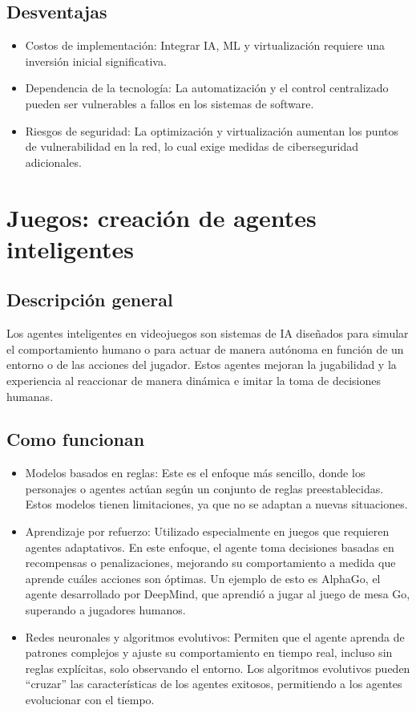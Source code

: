 \documentclass[12pt]{article}
\begin{document}
\subsection{Desventajas}
\begin{itemize}
    \item Costos de implementación: 
    Integrar IA, ML y virtualización requiere una inversión inicial significativa.
    \item Dependencia de la tecnología: 
    La automatización y el control centralizado pueden ser vulnerables a fallos en los sistemas de software.
    \item Riesgos de seguridad: 
    La optimización y virtualización aumentan los puntos de vulnerabilidad en la red, lo cual exige medidas de ciberseguridad adicionales.
\end{itemize}

\section{Juegos: creación de agentes inteligentes}
\subsection{Descripción general}
Los agentes inteligentes en videojuegos son sistemas de IA diseñados para simular el comportamiento humano o para actuar de manera
autónoma en función de un entorno o de las acciones del jugador. Estos agentes mejoran la jugabilidad y la experiencia al reaccionar 
de manera dinámica e imitar la toma de decisiones humanas.
\subsection{Como funcionan}
\begin{itemize}
    \item Modelos basados en reglas:
    Este es el enfoque más sencillo, donde los personajes o agentes actúan según un conjunto de reglas preestablecidas. 
    Estos modelos tienen limitaciones, ya que no se adaptan a nuevas situaciones.
    \item Aprendizaje por refuerzo: 
    Utilizado especialmente en juegos que requieren agentes adaptativos. 
    En este enfoque, el agente toma decisiones basadas en recompensas o penalizaciones, mejorando su comportamiento a 
    medida que aprende cuáles acciones son óptimas. Un ejemplo de esto es AlphaGo, el agente desarrollado por DeepMind, 
    que aprendió a jugar al juego de mesa Go, superando a jugadores humanos.
    \item Redes neuronales y algoritmos evolutivos: 
    Permiten que el agente aprenda de patrones complejos y ajuste su comportamiento en tiempo real, incluso sin reglas explícitas, 
    solo observando el entorno. Los algoritmos evolutivos pueden “cruzar” las características de los agentes exitosos, permitiendo a 
    los agentes evolucionar con el tiempo.
\end{itemize}
\end{document}
